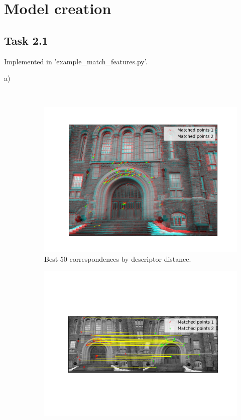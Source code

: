 \documentclass[a4paper]{article} %
\begin{document}
\section{Model creation}

    \subsection*{Task 2.1}
    Implemented in 'example\_match\_features.py'.
    \begin{description}
        \item [a)]  \hfill \\
            \begin{figure}[H]
                \center
                \includegraphics[width= 0.7\linewidth]{Correspondence}
                \caption{Best 50 correspondences by descriptor distance.}
            \end{figure}
            \begin{figure}[H]
                \center
                \includegraphics[width= \linewidth]{Matches}

\end{figure}
\end{description}
\end{document}

